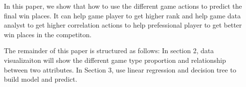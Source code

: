 
In this paper, we show that how to use the different game actions to predict the final win places. It can 
help game player to get higher rank and help game data analyst to get higher correlation actions to help prefessional player
to get better win places in the competiton.



The remainder of this paper is structured as follows: 
In section 2, data visualizaiton will show the different game type proportion and relationship between two attributes.
In Section 3, use linear regression and decision tree to build model and predict.

